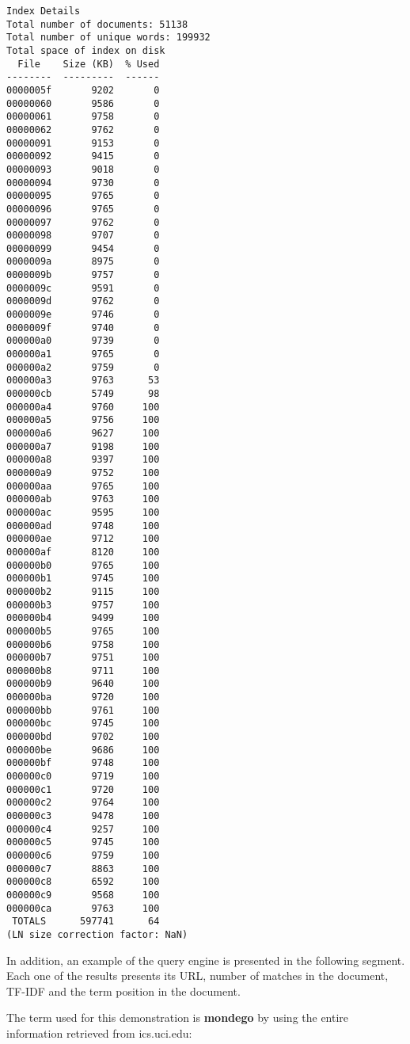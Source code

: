 \documentclass[paper=a4, fontsize=11pt]{scrartcl} %
\numberwithin{equation}{section} %
\numberwithin{table}{section} %
\begin{document}
\begin{verbatim}
Index Details
Total number of documents: 51138
Total number of unique words: 199932
Total space of index on disk
  File    Size (KB)  % Used
--------  ---------  ------
0000005f       9202       0
00000060       9586       0
00000061       9758       0
00000062       9762       0
00000091       9153       0
00000092       9415       0
00000093       9018       0
00000094       9730       0
00000095       9765       0
00000096       9765       0
00000097       9762       0
00000098       9707       0
00000099       9454       0
0000009a       8975       0
0000009b       9757       0
0000009c       9591       0
0000009d       9762       0
0000009e       9746       0
0000009f       9740       0
000000a0       9739       0
000000a1       9765       0
000000a2       9759       0
000000a3       9763      53
000000cb       5749      98
000000a4       9760     100
000000a5       9756     100
000000a6       9627     100
000000a7       9198     100
000000a8       9397     100
000000a9       9752     100
000000aa       9765     100
000000ab       9763     100
000000ac       9595     100
000000ad       9748     100
000000ae       9712     100
000000af       8120     100
000000b0       9765     100
000000b1       9745     100
000000b2       9115     100
000000b3       9757     100
000000b4       9499     100
000000b5       9765     100
000000b6       9758     100
000000b7       9751     100
000000b8       9711     100
000000b9       9640     100
000000ba       9720     100
000000bb       9761     100
000000bc       9745     100
000000bd       9702     100
000000be       9686     100
000000bf       9748     100
000000c0       9719     100
000000c1       9720     100
000000c2       9764     100
000000c3       9478     100
000000c4       9257     100
000000c5       9745     100
000000c6       9759     100
000000c7       8863     100
000000c8       6592     100
000000c9       9568     100
000000ca       9763     100
 TOTALS      597741      64
(LN size correction factor: NaN)
\end{verbatim}
\newpage
In addition, an example of the query engine is presented in the following segment. Each one of the results presents its URL, number of matches in the document, TF-IDF and the term position in the document.

The term used for this demonstration is \textbf{mondego} by using the entire information retrieved from ics.uci.edu:
\end{document}
